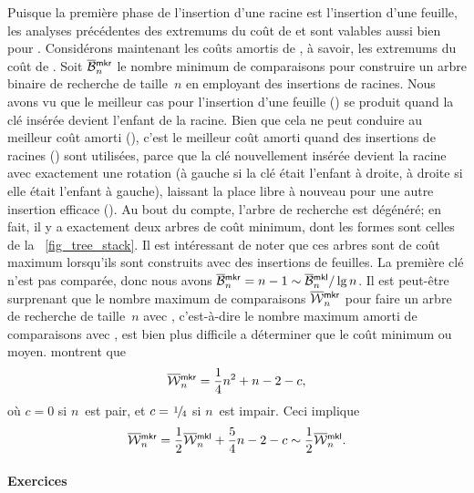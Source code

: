 Puisque la première phase de l'insertion d'une racine est l'insertion
d'une feuille, les analyses précédentes des extremums du coût de
 et  sont valables aussi bien pour
. Considérons maintenant les coûts amortis de
, à savoir, les extremums du coût de .  Soit
\(\OB{\fun{mkr}}{n}\) le nombre minimum
de comparaisons pour construire un arbre binaire de recherche de
taille~\(n\) en employant des insertions de racines. Nous avons vu que
le meilleur cas pour l'insertion d'une feuille () se
produit quand la clé insérée devient l'enfant de la racine. Bien que
cela ne peut conduire au meilleur coût amorti (), c'est le
meilleur coût amorti quand des insertions de racines ()
sont utilisées, parce que la clé nouvellement insérée devient la
racine avec exactement une rotation (à gauche si la clé était l'enfant
à droite, à droite si elle était l'enfant à gauche), laissant la place
libre à nouveau pour une autre insertion efficace (). Au
bout du compte, l'arbre de recherche est dégénéré; en fait, il y a
exactement deux arbres de coût minimum, dont les formes sont celles de
la \fig~\vref{fig_tree_stack}. Il est intéressant de noter que ces
arbres sont de coût maximum lorsqu'ils sont construits avec des
insertions de feuilles. La première clé n'est pas comparée, donc nous
avons \(\OB{\fun{mkr}}{n} = n - 1 \sim \OB{\fun{mkl}}{n}/\lg n\). Il
est peut-être surprenant que le nombre maximum de comparaisons
\(\OW{\fun{mkr}}{n}\) pour faire un
arbre de recherche de taille~\(n\) avec , c'est-à-dire le
nombre maximum amorti de comparaisons avec , est bien plus
difficile a déterminer que le coût minimum ou moyen.
\cite{GeldenhuysVanderMerwe_2009} montrent que
\begin{equation*}
\abovedisplayskip=4pt
\belowdisplayskip=4pt
\OW{\fun{mkr}}{n} = \frac{1}{4}n^2 + n - 2 - c,
\end{equation*}
où \(c = 0\) si \(n\)~est pair, et \(c=\myfrac{1}/{4}\) si
\(n\)~est impair. Ceci implique
\begin{equation*}
\abovedisplayskip=4pt
\belowdisplayskip=-8pt
\OW{\fun{mkr}}{n} = \frac{1}{2}\OW{\fun{mkl}}{n} + \frac{5}{4}n - 2 -
c \sim \frac{1}{2}\OW{\fun{mkl}}{n}.
\end{equation*}

\paragraph{Exercices}

